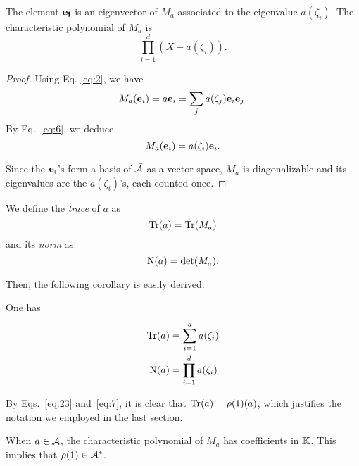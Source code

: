 \begin{theorem}
  \label{th:stickelberger}
  The element $\mathbf{e_i}$ is an eigenvector of $M_a$ associated to
  the eigenvalue $a(\zeta_i)$. The characteristic polynomial of $M_a$
  is
  \[\prod_{i=1}^d(X-a(\zeta_i))\text{.}\]
\end{theorem}
\begin{proof}
  Using Eq. \eqref{eq:2}, we have
  \begin{equation}
    \label{eq:19}
    M_a(\mathbf{e}_i) = a\mathbf{e}_i = \sum_ja(\zeta_j)\mathbf{e}_i\mathbf{e}_j
    \text{.}
  \end{equation}
  By Eq.~\eqref{eq:6}, we deduce
  \begin{equation}
    \label{eq:20}
    M_a(\mathbf{e}_i) = a(\zeta_i)\mathbf{e}_i
    \text{.}
  \end{equation}

  Since the $\mathbf{e}_i$'s form a basis of $\bar{\mathcal{A}}$ as a
  vector space, $M_a$ is diagonalizable and its eigenvalues are the
  $a(\zeta_i)$'s, each counted once.
\end{proof}

\begin{definition}
  \label{def:trace}
  We define the \emph{trace} of $a$ as
  \[\operatorname{Tr}(a) = \operatorname{Tr}(M_a)\]
  and its \emph{norm} as
  \[\operatorname{N}(a) = \det(M_a)\text{.}\]
\end{definition}
Then, the following corollary is easily derived.

\begin{corollary}
  \label{th:stickelberger-trace-det}
  One has
  \begin{align}
    \label{eq:23}
    \operatorname{Tr}(a) &= \sum_{i=1}^da(\zeta_i)\\
    \label{eq:24}
    \operatorname{N}(a) &= \prod_{i=1}^da(\zeta_i)
  \end{align}
\end{corollary}

By Eqs.~\eqref{eq:23} and~\eqref{eq:7}, it is clear that
$\operatorname{Tr}(a)=\rho(1)(a)$, which justifies the notation we employed in the
last section.

When $a\in\mathcal{A}$, the characteristic polynomial of $M_a$ has
coefficients in $\mathbb{K}$. This implies that $\rho(1)\in\mathcal{A}^\ast$.



